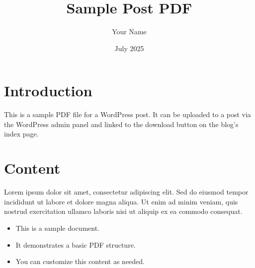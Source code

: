 \documentclass[a4paper,12pt]{article}
\begin{document}
\title{Sample Post PDF}
\author{Your Name}
\date{July 2025}
\maketitle

\section{Introduction}
This is a sample PDF file for a WordPress post. It can be uploaded to a post via the WordPress admin panel and linked to the download button on the blog's index page.

\section{Content}
Lorem ipsum dolor sit amet, consectetur adipiscing elit. Sed do eiusmod tempor incididunt ut labore et dolore magna aliqua. Ut enim ad minim veniam, quis nostrud exercitation ullamco laboris nisi ut aliquip ex ea commodo consequat.

\begin{itemize}
    \item This is a sample document.
    \item It demonstrates a basic PDF structure.
    \item You can customize this content as needed.
\end{itemize}
\end{document}
